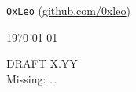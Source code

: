 \begin{titlepage}
	{\normalfont \Large \texttt{0xLeo} (\url{github.com/0xleo}) \\} %
	
	\vspace{0.5\baselineskip} %
	
	
	\vfill %
	
	
	
	\vspace{0.3\baselineskip} %
	
	\today %
	
	{DRAFT X.YY} %
	{\\Missing: \ldots}

\end{titlepage}

